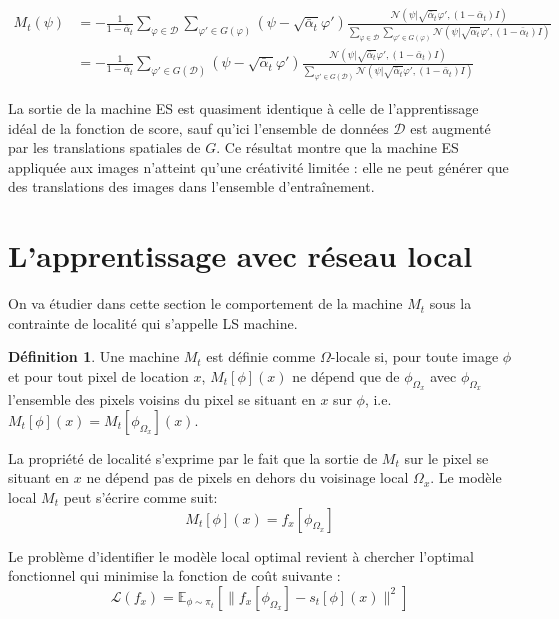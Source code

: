 \documentclass[a4paper,10pt]{article}
\theoremstyle{definition} %
\newtheorem{definition}{Définition}[section]
\theoremstyle{definition} %
\theoremstyle{definition} %
\theoremstyle{definition} %
\begin{document}
\begin{align*}
        M_t(\psi) &= -\frac{1}{1-\bar \alpha_t} \sum\limits_{\varphi \in \mathcal{D}} \sum\limits_{\varphi' \in G(\varphi)} (\psi - \sqrt{\bar \alpha_t} \varphi') \frac{\mathcal{N}(\psi | \sqrt{\bar \alpha_t} \varphi', (1-\bar \alpha_t) I) }{\sum\limits_{\varphi \in \mathcal{D}} \sum\limits_{\varphi'\in G(\varphi)} \mathcal{N}(\psi | \sqrt{\bar \alpha_t} \varphi', (1-\bar \alpha_t) I)}\\
        &= -\frac{1}{1-\bar \alpha_t}  \sum\limits_{\varphi' \in G(\mathcal{D})} (\psi - \sqrt{\bar \alpha_t} \varphi') \frac{\mathcal{N}(\psi | \sqrt{\bar \alpha_t} \varphi', (1-\bar \alpha_t) I) }{ \sum\limits_{\varphi'\in G(\mathcal{D})} \mathcal{N}(\psi | \sqrt{\bar \alpha_t} \varphi', (1-\bar \alpha_t) I)}
\end{align*}

La sortie de la machine ES est quasiment identique à celle de l'apprentissage idéal de la fonction de score, sauf qu'ici l'ensemble de données $\mathcal{D}$ est augmenté par les translations spatiales de $G$. Ce résultat montre que la machine ES appliquée aux images n'atteint qu'une créativité limitée : elle ne peut générer que des translations des images dans l'ensemble d'entraînement.


\section{L'apprentissage avec réseau local}
On va étudier dans cette section le comportement de la machine $M_t$ sous la contrainte de localité qui s'appelle LS machine.

\begin{definition}
    Une machine $M_t$ est définie comme $\Omega$-locale si, pour toute image $\phi$ et pour tout pixel de location $x$, $M_t[\phi](x)$ ne dépend que de $\phi_{\Omega_x}$ avec $\phi_{\Omega_x}$ l'ensemble des pixels voisins du pixel se situant en $x$ sur $\phi$, i.e. $M_t[\phi](x) = M_t[\phi_{\Omega_x}](x)$.
\end{definition}

La propriété de localité s'exprime par le fait que la sortie de $M_t$ sur le pixel se situant en $x$ ne dépend pas de pixels en dehors du voisinage local $\Omega_x$. Le modèle local $M_t$ peut s'écrire comme suit:
\[ M_t[\phi](x) = f_x[\phi_{\Omega_x}] \]

Le problème d'identifier le modèle local optimal revient à chercher l'optimal fonctionnel qui minimise la fonction de coût suivante :
\[ \mathcal{L}(f_x) = \mathbb{E}_{\phi \sim \pi_t} \left[ \| f_x[\phi_{\Omega_x}] - s_t[\phi](x) \|^2 \right] \]
\end{document}
